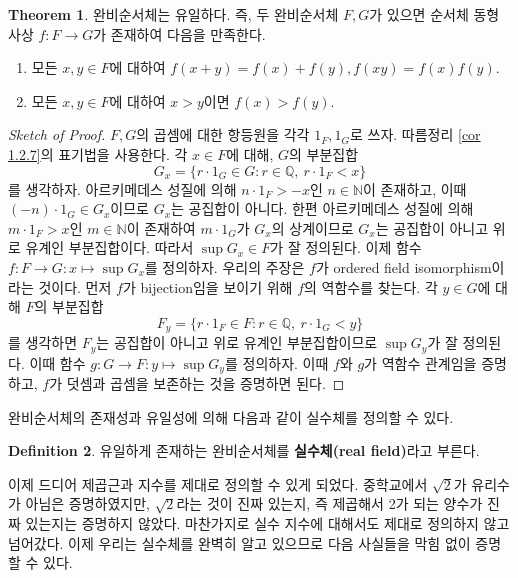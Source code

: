 \documentclass[11pt]{book}
\numberwithin{equation}{chapter}
\def\NN{\mathbb{N}}
\def\QQ{\mathbb{Q}}
\theoremstyle{definition}
\newtheorem{thm}{Theorem}[section]
\newtheorem{defn}[thm]{Definition}
\begin{document}
    \begin{thm}
        완비순서체는 유일하다. 즉, 두 완비순서체 \(F, G\)가 있으면 순서체 동형사상 \(f : F \to G\)가 존재하여 다음을 만족한다.
        \begin{enumerate} [label=(\alph*), leftmargin=2\parindent]
            \item 모든 \(x, y \in F\)에 대하여 \(f(x+y) = f(x) + f(y), f(xy) = f(x)f(y)\).
            \item 모든 \(x, y \in F\)에 대하여 \(x > y\)이면 \(f(x) > f(y)\).
        \end{enumerate}
    \end{thm}
    \begin{proof}[Sketch of Proof]
        \(F, G\)의 곱셈에 대한 항등원을 각각 \(1_F, 1_G\)로 쓰자. 따름정리 \ref{cor 1.2.7}의 표기법을 사용한다. 각 \(x \in F\)에 대해, \(G\)의 부분집합
        \[
            G_x = \{r \cdot 1_G \in G: r \in \QQ, \ r \cdot 1_F < x\}
        \]
        를 생각하자. 아르키메데스 성질에 의해 \(n \cdot 1_F > -x\)인 \(n \in \NN\)이 존재하고, 이때 \((-n) \cdot 1_G \in G_x\)이므로 \(G_x\)는 공집합이 아니다. 한편 아르키메데스 성질에 의해 \(m \cdot 1_F > x\)인 \(m \in \NN\)이 존재하여 \(m \cdot 1_G\)가 \(G_x\)의 상계이므로 \(G_x\)는 공집합이 아니고 위로 유계인 부분집합이다. 따라서 \(\sup G_x \in F\)가 잘 정의된다. 이제 함수 \(f : F \to G : x \mapsto \sup G_x\)를 정의하자. 우리의 주장은 \(f\)가 ordered field isomorphism이라는 것이다. 먼저 \(f\)가 bijection임을 보이기 위해 \(f\)의 역함수를 찾는다. 각 \(y \in G\)에 대해 \(F\)의 부분집합
        \[
        F_y = \{r \cdot 1_F \in F: r \in \QQ, \ r \cdot 1_G < y\}
        \]
        를 생각하면 \(F_y\)는 공집합이 아니고 위로 유계인 부분집합이므로 \(\sup G_y\)가 잘 정의된다. 이때 함수 \(g : G \to F : y \mapsto \sup G_y\)를 정의하자. 이때 \(f\)와 \(g\)가 역함수 관계임을 증명하고, \(f\)가 덧셈과 곱셈을 보존하는 것을 증명하면 된다.
    \end{proof}

완비순서체의 존재성과 유일성에 의해 다음과 같이 실수체를 정의할 수 있다.

    \begin{defn}
        유일하게 존재하는 완비순서체를 \textbf{실수체(real field)}라고 부른다.
    \end{defn}

이제 드디어 제곱근과 지수를 제대로 정의할 수 있게 되었다. 중학교에서 \(\sqrt{2}\)가 유리수가 아님은 증명하였지만, \(\sqrt{2}\)라는 것이 진짜 있는지, 즉 제곱해서 2가 되는 양수가 진짜 있는지는 증명하지 않았다. 마찬가지로 실수 지수에 대해서도 제대로 정의하지 않고 넘어갔다. 이제 우리는 실수체를 완벽히 알고 있으므로 다음 사실들을 막힘 없이 증명할 수 있다.
\end{document}
